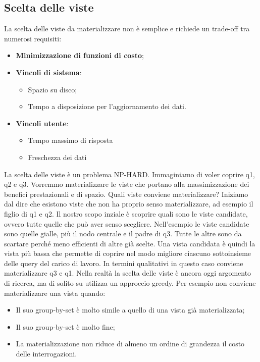 \subsection{Scelta delle viste}
La scelta delle viste da materializzare non è semplice e richiede un trade-off tra numerosi requisiti:
\begin{itemize}
	\item \textbf{Minimizzazione di funzioni di costo};
	\item \textbf{Vincoli di sistema}:
	\begin{itemize}
		\item Spazio su disco;
		\item Tempo a disposizione per l'aggiornamento dei dati.
	\end{itemize}
	\item \textbf{Vincoli utente}:
	\begin{itemize}
		\item Tempo massimo di risposta
		\item Freschezza dei dati
	\end{itemize}
\end{itemize}
La scelta delle viste è un problema NP-HARD. Immaginiamo di voler coprire q1, q2 e q3. Vorremmo materializzare le viste che portano alla massimizzazione dei benefici prestazionali e di spazio. Quali viste conviene materializzare?
\noindent Iniziamo dal dire che esistono viste che non ha proprio senso materializzare, ad esempio il figlio di q1 e q2.\newline
Il nostro scopo inziale è scoprire quali sono le viste candidate, ovvero tutte quelle che può aver senso scegliere.\newline
Nell'esempio le viste candidate sono quelle gialle, più il nodo centrale e il padre di q3. Tutte le altre sono da scartare perché meno efficienti di altre già scelte.\newline
Una vista candidata è quindi la vista più bassa che permette di coprire nel modo migliore ciascuno sottoinsieme delle query del carico di lavoro.\newline
In termini qualitativi in questo caso conviene materializzare q3 e q1. Nella realtà la scelta delle viste è ancora oggi argomento di ricerca, ma di solito su utilizza un approccio greedy.
Per esempio non conviene materializzare una vista quando:
\begin{itemize}
	\item Il suo group-by-set è molto simile a quello di una vista già materializzata;
	\item Il suo group-by-set è molto fine;
	\item La materializzazione non riduce di almeno un ordine di grandezza il costo delle interrogazioni.
\end{itemize}
